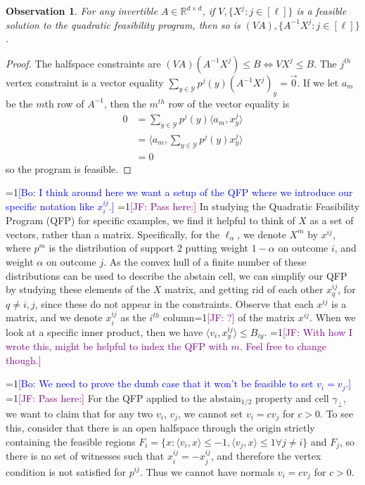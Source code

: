 \documentclass[anon]{colt2020} %
\newcommand{\Comments}{1}
\newcommand{\mynote}[2]{\ifnum\Comments=1\textcolor{#1}{#2}\fi}
\newcommand{\jessie}[1]{\mynote{purple}{[JF: #1]}}
\newcommand{\bo}[1]{\mynote{blue}{[Bo: #1]}}
\newcommand{\reals}{\mathbb{R}}
\newcommand{\abstain}[1]{\mathrm{abstain}_{#1}}
\newcommand{\Y}{\mathcal{Y}}
\newcommand{\ellabs}[1]{\ell_{#1}}
\newcommand{\inprod}[2]{\langle #1, #2 \rangle}%
\newtheorem{observation}{Observation}
\begin{document}
\begin{observation} \label{obs:qfp-invariant-lin}
  For any invertible $A \in \reals^{d \times d}$, if $V,\{X^j : j \in [\ell]\}$ is a feasible solution to the quadratic feasibility program, then so is $(VA),\{A^{-1}X^j : j \in [\ell]\}$.
\end{observation}
\begin{proof}
  The halfspace constraints are $(VA)(A^{-1}X^j) \leq B \iff VX^{j} \leq B$.
  The $j^{th}$ vertex constraint is a vector equality $\sum_{y \in \Y} p^j(y) (A^{-1}X^j)_y = \vec{0}$.
  If we let $a_m$ be the $m$th row of $A^{-1}$, then the $m^{th}$ row of the vector equality is
  \begin{align*}
    0 &= \sum_{y \in \Y} p^j(y) \inprod{a_m}{x^j_y}  \\
      &= \inprod{a_m}{\sum_{y \in \Y} p^j(y) x^j_y}  \\
      &= 0
  \end{align*}
  so the program is feasible.
\end{proof}

\bo{I think around here we want a setup of the QFP where we introduce our specific notation like $x^{ij}_i$.}
\jessie{Pass here:}
In studying the Quadratic Feasibility Program (QFP) for specific examples, we find it helpful to think of $X$ as a set of vectors, rather than a matrix.
Specifically, for the $\ellabs{\alpha}$, we denote $X^m$ by $x^{ij}$, where $p^m$ is the distribution of support $2$ putting weight $1-\alpha$ on outcome $i$, and weight $\alpha$ on outcome $j$.
As the convex hull of a finite number of these distributions can be used to describe the abstain cell, we can simplify our QFP by studying these elements of the $X$ matrix, and getting rid of each other $x^{ij}_q$, for $q \neq i,j$, since these do not appear in the constraints.
Observe that each $x^{ij}$ is a matrix, and we denote $x^{ij}_i$ as the $i^{th}$ column\jessie{?} of the matrix $x^{ij}$.
When we look at a specific inner product, then we have $\inprod{v_i}{x^{ij}_y} \leq B_{iy}$.
\jessie{With how I wrote this, might be helpful to index the QFP with $m$.  Feel free to change though.}


\bo{We need to prove the dumb case that it won't be feasible to set $v_i = v_j$.}
\jessie{Pass here:}
For the QFP applied to the $\abstain{1/2}$ property and cell $\gamma_\bot$, we want to claim that for any two $v_i$, $v_j$, we cannot set $v_i = c v_j$ for $c > 0$.
To see this, consider that there is an open halfspace through the origin strictly containing the feasible regions $F_i = \{x : \inprod{v_i}{x} \leq -1, \inprod{v_j}{x} \leq 1 \forall j \neq i\}$ and $F_j$, so there is no set of witnesses such that $x^{ij}_i = -x^{ij}_j$, and therefore the vertex condition is not satisfied for $p^{ij}$.
Thus we cannot have normals $v_i = c v_j$ for $c > 0$.
\end{document}
